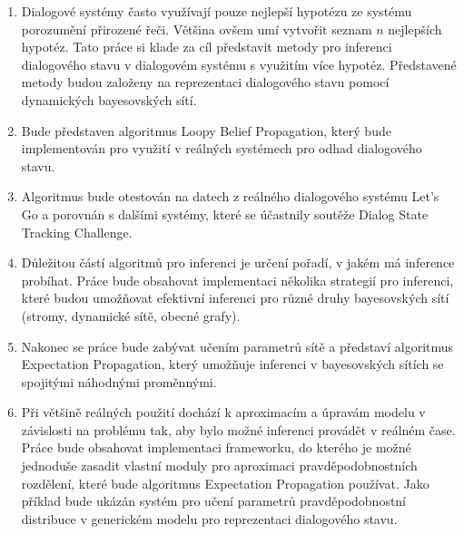 \begin{enumerate}
\item Dialogové systémy často využívají pouze nejlepší hypotézu ze systému porozumění přirozené řeči.
    Většina ovšem umí vytvořit seznam $n$ nejlepších hypotéz.
    Tato práce si klade za cíl představit metody pro inferenci dialogového stavu v dialogovém systému s využitím více hypotéz.
    Představené metody budou založeny na reprezentaci dialogového stavu pomocí dynamických bayesovských sítí.
\item Bude představen algoritmus Loopy Belief Propagation, který bude implementován pro využití v reálných systémech pro odhad dialogového stavu.
\item Algoritmus bude otestován na datech z reálného dialogového systému Let's Go a porovnán s dalšími systémy, které se účastnily soutěže Dialog State Tracking Challenge.
\item Důležitou částí algoritmů pro inferenci je určení pořadí, v jakém má inference probíhat.
    Práce bude obsahovat implementaci několika strategií pro inferenci, které budou umožňovat efektivní inferenci pro různé druhy bayesovských sítí (stromy, dynamické sítě, obecné grafy).
\item Nakonec se práce bude zabývat učením parametrů sítě a představí algoritmus Expectation Propagation, který umožňuje inferenci v bayesovských sítích se spojitými náhodnými proměnnými.
\item Při většině reálných použití dochází k aproximacím a úpravám modelu v závislosti na problému tak, aby bylo možné inferenci provádět v reálném čase.
Práce bude obsahovat implementaci frameworku, do kterého je možné jednoduše zasadit vlastní moduly pro aproximaci pravděpodobnostních rozdělení, které bude algoritmus Expectation Propagation používat.
Jako příklad bude ukázán systém pro učení parametrů pravděpodobnostní distribuce v generickém modelu pro reprezentaci dialogového stavu.
\end{enumerate}
